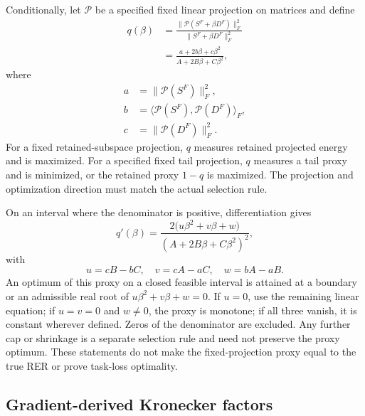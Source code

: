 Conditionally, let $\mathcal P$ be a specified fixed linear projection on matrices and define
\begin{equation}
\begin{aligned}
q(\beta)&=\frac{\|\mathcal P(S^F+\beta D^F)\|_F^2}{\|S^F+\beta D^F\|_F^2}\\
&=\frac{a+2b\beta+c\beta^2}{A+2B\beta+C\beta^2},
\end{aligned}
\end{equation}
where
\begin{equation}
\begin{aligned}
a&=\|\mathcal P(S^F)\|_F^2, \\
b&=\langle\mathcal P(S^F),\mathcal P(D^F)\rangle_F, \\
c&=\|\mathcal P(D^F)\|_F^2.
\end{aligned}
\end{equation}
For a fixed retained-subspace projection, $q$ measures retained projected energy and is maximized. For a specified fixed tail projection, $q$ measures a tail proxy and is minimized, or the retained proxy $1-q$ is maximized. The projection and optimization direction must match the actual selection rule.

On an interval where the denominator is positive, differentiation gives
\begin{equation}
q'(\beta)=\frac{2\big(u\beta^2+v\beta+w\big)}{(A+2B\beta+C\beta^2)^2},
\end{equation}
with
\begin{equation}
u=cB-bC,\quad v=cA-aC,\quad w=bA-aB.
\end{equation}
An optimum of this proxy on a closed feasible interval is attained at a boundary or an admissible real root of $u\beta^2+v\beta+w=0$. If $u=0$, use the remaining linear equation; if $u=v=0$ and $w\ne0$, the proxy is monotone; if all three vanish, it is constant wherever defined. Zeros of the denominator are excluded. Any further cap or shrinkage is a separate selection rule and need not preserve the proxy optimum. These statements do not make the fixed-projection proxy equal to the true RER or prove task-loss optimality.


\subsection{Gradient-derived Kronecker factors}\label{sup:fisher-estimation}

